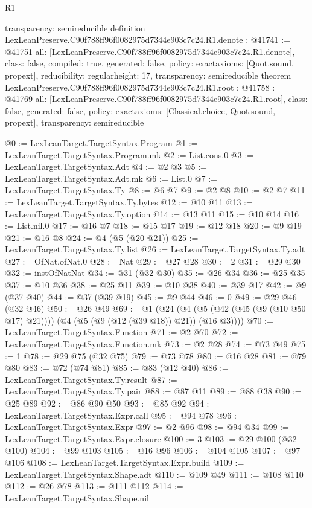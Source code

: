 \begin{lexlean}{R1}
\begin{coremodule}
{  transparency: semireducible
}
definition LexLeanPreserve.C90f788ff96f0082975d7344e903c7c24.R1.denote : @41741 := @41751 {
  all: [LexLeanPreserve.C90f788ff96f0082975d7344e903c7c24.R1.denote],
  class: false,
  compiled: true,
  generated: false,
  policy: exact{axioms: [Quot.sound, propext]},
  reducibility: regular{height: 17},
  transparency: semireducible
}
theorem LexLeanPreserve.C90f788ff96f0082975d7344e903c7c24.R1.root : @41758 := @41769 {
  all: [LexLeanPreserve.C90f788ff96f0082975d7344e903c7c24.R1.root],
  class: false,
  generated: false,
  policy: exact{axioms: [Classical.choice, Quot.sound, propext]},
  transparency: semireducible
}

@0 := LexLeanTarget.TargetSyntax.Program
@1 := LexLeanTarget.TargetSyntax.Program.mk
@2 := List.cons.{0}
@3 := LexLeanTarget.TargetSyntax.Adt
@4 := @2 @3
@5 := LexLeanTarget.TargetSyntax.Adt.mk
@6 := List.{0}
@7 := LexLeanTarget.TargetSyntax.Ty
@8 := @6 @7
@9 := @2 @8
@10 := @2 @7
@11 := LexLeanTarget.TargetSyntax.Ty.bytes
@12 := @10 @11
@13 := LexLeanTarget.TargetSyntax.Ty.option
@14 := @13 @11
@15 := @10 @14
@16 := List.nil.{0}
@17 := @16 @7
@18 := @15 @17
@19 := @12 @18
@20 := @9 @19
@21 := @16 @8
@24 := @4 (@5 (@20 @21))
@25 := LexLeanTarget.TargetSyntax.Ty.list
@26 := LexLeanTarget.TargetSyntax.Ty.adt
@27 := OfNat.ofNat.{0}
@28 := Nat
@29 := @27 @28
@30 := 2
@31 := @29 @30
@32 := instOfNatNat
@34 := @31 (@32 @30)
@35 := @26 @34
@36 := @25 @35
@37 := @10 @36
@38 := @25 @11
@39 := @10 @38
@40 := @39 @17
@42 := @9 (@37 @40)
@44 := @37 (@39 @19)
@45 := @9 @44
@46 := 0
@49 := @29 @46 (@32 @46)
@50 := @26 @49
@69 := @1
    (@24 (@4 (@5 (@42 (@45 (@9 (@10 @50 @17) @21)))) (@4 (@5 (@9 (@12 (@39 @18)) @21)) (@16 @3))))
@70 := LexLeanTarget.TargetSyntax.Function
@71 := @2 @70
@72 := LexLeanTarget.TargetSyntax.Function.mk
@73 := @2 @28
@74 := @73 @49
@75 := 1
@78 := @29 @75 (@32 @75)
@79 := @73 @78
@80 := @16 @28
@81 := @79 @80
@83 := @72 (@74 @81)
@85 := @83 (@12 @40)
@86 := LexLeanTarget.TargetSyntax.Ty.result
@87 := LexLeanTarget.TargetSyntax.Ty.pair
@88 := @87 @11
@89 := @88 @38
@90 := @25 @89
@92 := @86 @90 @50
@93 := @85 @92
@94 := LexLeanTarget.TargetSyntax.Expr.call
@95 := @94 @78
@96 := LexLeanTarget.TargetSyntax.Expr
@97 := @2 @96
@98 := @94 @34
@99 := LexLeanTarget.TargetSyntax.Expr.closure
@100 := 3
@103 := @29 @100 (@32 @100)
@104 := @99 @103
@105 := @16 @96
@106 := @104 @105
@107 := @97 @106
@108 := LexLeanTarget.TargetSyntax.Expr.build
@109 := LexLeanTarget.TargetSyntax.Shape.adt
@110 := @109 @49
@111 := @108 @110
@112 := @26 @78
@113 := @111 @112
@114 := LexLeanTarget.TargetSyntax.Shape.nil

\end{coremodule}
\end{lexlean}
